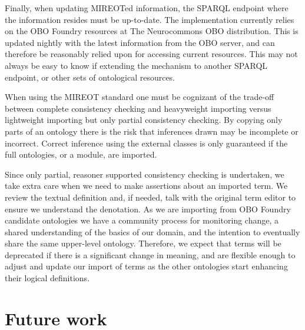 \documentclass{ao2e}%
\begin{document}
Finally, when updating MIREOTed information, the SPARQL endpoint where the information resides must be up-to-date. The implementation currently relies on the \ac{OBO} Foundry resources at The Neurocommons \ac{OBO} distribution. This is updated nightly with the latest information from the \ac{OBO} server, and can therefore be reasonably relied upon for accessing current resources. This may not always be easy to know if extending the mechanism to another SPARQL endpoint, or other sets of ontological resources.

When using the \ac{MIREOT} standard one must be cognizant of the trade-off between complete consistency checking and heavyweight importing versus lightweight importing but only partial consistency checking.
By copying only parts of an ontology there is the risk that inferences drawn may be incomplete or incorrect. 
Correct inference using the external classes is only guaranteed if the full ontologies, or a module, are imported.

Since only partial, reasoner supported consistency checking is undertaken, we take extra care when we need to make assertions about an imported term. %
We review the textual definition and, if needed, talk with the original term editor to ensure we understand the denotation.
As we are importing from \ac{OBO} Foundry candidate ontologies we have a community process for monitoring change, a shared understanding of the basics of our domain, and the intention to eventually share the same upper-level ontology. 
Therefore, we expect that terms will be deprecated if there is a significant change in meaning, and are flexible enough to adjust and update our import of terms as the other ontologies start enhancing their logical definitions.


\section*{Future work}
\end{document}
